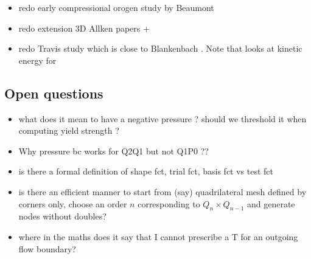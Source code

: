 \begin{itemize}
\item redo early compressional orogen study by Beaumont \cite{bequ94}
\item redo extension 3D Allken papers + \cite{poay84,katl95} 
\item redo Travis study \cite{trab90} which is close to Blankenbach \cite{blbc89}. Note that \cite{maie12} looks at kinetic energy for \cite{trab90} 
\end{itemize}


\subsection{Open questions}

\begin{itemize}
\item what does it mean to have a negative pressure ? should we threshold it when computing yield strength ? 
\item Why pressure bc works for Q2Q1 but not Q1P0 ??
\item is there a formal definition of shape fct, trial fct, basis fct vs test fct 
\item is there an efficient manner to start from (say) quadrilateral mesh defined by corners only, choose an 
order $n$ corresponding to $Q_n \times Q_{n-1}$ and generate nodes without doubles?
\item where in the maths does it say that I cannot prescribe a T for an outgoing flow boundary?
\end{itemize}





